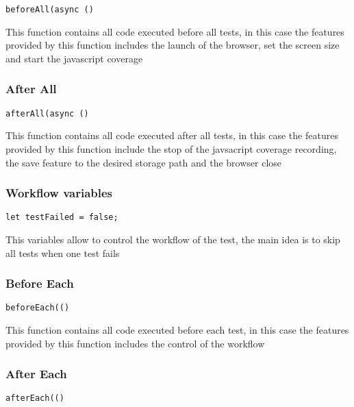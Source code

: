 \documentclass[a4paper]{article}
\begin{document}
\begin{lstlisting}
beforeAll(async ()
\end{lstlisting}

This function contains all code executed before all tests, in this case the
features provided by this function includes the launch of the browser, set
the screen size and start the javascript coverage

\hypertarget{toc225}{}
\subsubsection{After All}

\begin{lstlisting}
afterAll(async ()
\end{lstlisting}

This function contains all code executed after all tests, in this case the
features provided by this function include the stop of the javsacript coverage
recording, the save feature to the desired storage path and the browser close

\hypertarget{toc226}{}
\subsubsection{Workflow variables}

\begin{lstlisting}
let testFailed = false;
\end{lstlisting}

This variables allow to control the workflow of the test, the main idea is to
skip all tests when one test fails

\hypertarget{toc227}{}
\subsubsection{Before Each}

\begin{lstlisting}
beforeEach(()
\end{lstlisting}

This function contains all code executed before each test, in this case the
features provided by this function includes the control of the workflow

\hypertarget{toc228}{}
\subsubsection{After Each}

\begin{lstlisting}
afterEach(()
\end{lstlisting}
\end{document}
